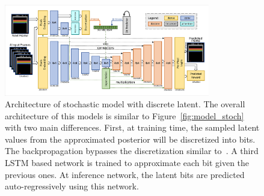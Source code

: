\begin{figure}[t]
\centering
\includegraphics[width=0.8\textwidth]{figures/model_basic_disc.pdf}
\caption{Architecture of stochastic model with discrete latent. The overall architecture of this models is similar to Figure~\ref{fig:model_stoch} with two main differences. First, at training time, the sampled latent values from the approximated posterior will be discretized into bits. The backpropagation bypasses the discretization similar to~\citet{van2017neural}. A third LSTM based network is trained to approximate each bit given the previous ones. At inference network, the latent bits are predicted auto-regressively using this network.} 
\label{fig:full_discrete}
\end{figure}





